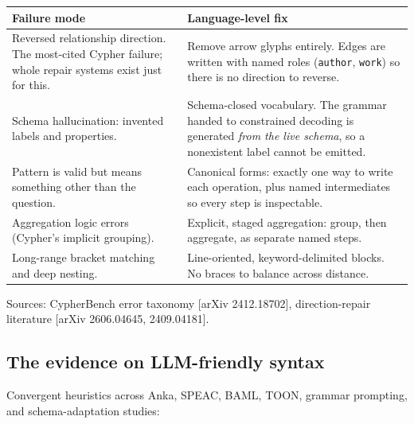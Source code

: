 \documentclass[11pt]{article}
\begin{document}
\begin{center}
\small
\begin{tabular}{p{6.2cm}p{7.6cm}}
\toprule
\textbf{Failure mode} & \textbf{Language-level fix} \\
\midrule
Reversed relationship direction. The most-cited Cypher failure; whole repair systems exist just for this. & Remove arrow glyphs entirely. Edges are written with named roles (\texttt{author}, \texttt{work}) so there is no direction to reverse. \\
\addlinespace
Schema hallucination: invented labels and properties. & Schema-closed vocabulary. The grammar handed to constrained decoding is generated \emph{from the live schema}, so a nonexistent label cannot be emitted. \\
\addlinespace
Pattern is valid but means something other than the question. & Canonical forms: exactly one way to write each operation, plus named intermediates so every step is inspectable. \\
\addlinespace
Aggregation logic errors (Cypher's implicit grouping). & Explicit, staged aggregation: group, then aggregate, as separate named steps. \\
\addlinespace
Long-range bracket matching and deep nesting. & Line-oriented, keyword-delimited blocks. No braces to balance across distance. \\
\bottomrule
\end{tabular}
\end{center}

Sources: CypherBench error taxonomy [arXiv 2412.18702], direction-repair literature [arXiv 2606.04645, 2409.04181].

\subsection{The evidence on LLM-friendly syntax}

Convergent heuristics across Anka, SPEAC, BAML, TOON, grammar prompting, and schema-adaptation studies:
\end{document}
